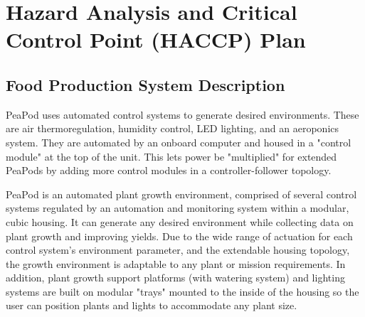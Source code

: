 \section{Hazard Analysis and Critical Control Point (HACCP) Plan}



\subsection{Food Production System Description}

PeaPod uses automated control systems to generate desired environments. These are air thermoregulation, humidity control, LED lighting, and an aeroponics system. They are automated by an onboard computer and housed in a "control module" at the top of the unit. This lets power be "multiplied" for extended PeaPods by adding more control modules in a controller-follower topology.

PeaPod is an automated plant growth environment, comprised of several control systems regulated by an automation and monitoring system within a modular, cubic housing. It can generate any desired environment while collecting data on plant growth and improving yields. Due to the wide range of actuation for each control system's environment parameter, and the extendable housing topology, the growth environment is adaptable to any plant or mission requirements. In addition, plant growth support platforms (with watering system) and lighting systems are built on modular "trays" mounted to the inside of the housing so the user can position plants and lights to accommodate any plant size.

